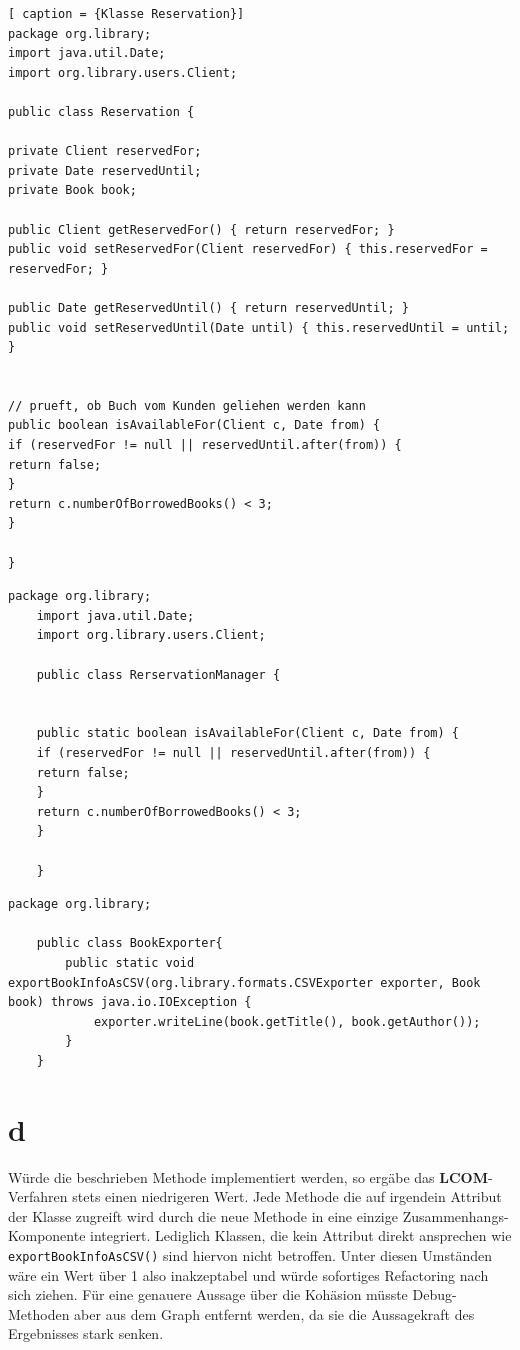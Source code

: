 \begin{lstlisting}[	caption = {Klasse Reservation}]
package org.library;
import java.util.Date;
import org.library.users.Client;

public class Reservation {

private Client reservedFor;
private Date reservedUntil;    
private Book book;

public Client getReservedFor() { return reservedFor; }
public void setReservedFor(Client reservedFor) { this.reservedFor = reservedFor; }

public Date getReservedUntil() { return reservedUntil; }
public void setReservedUntil(Date until) { this.reservedUntil = until; }


// prueft, ob Buch vom Kunden geliehen werden kann
public boolean isAvailableFor(Client c, Date from) {
if (reservedFor != null || reservedUntil.after(from)) {
return false;
}
return c.numberOfBorrowedBooks() < 3;
}

}
\end{lstlisting}

\begin{lstlisting}[caption = {RerservationManager}]
	package org.library;
	import java.util.Date;
	import org.library.users.Client;
	
	public class RerservationManager {
	

	public static boolean isAvailableFor(Client c, Date from) {
	if (reservedFor != null || reservedUntil.after(from)) {
	return false;
	}
	return c.numberOfBorrowedBooks() < 3;
	}
	
	}
\end{lstlisting}

\begin{lstlisting}[caption = BookExporter]
	package org.library;

	public class BookExporter{
		public static void exportBookInfoAsCSV(org.library.formats.CSVExporter exporter, Book book) throws java.io.IOException {        
			exporter.writeLine(book.getTitle(), book.getAuthor());        
		}   	
	}

\end{lstlisting}
\section*{d} 
Würde die beschrieben Methode implementiert werden, so ergäbe das \textbf{LCOM}-Verfahren stets einen niedrigeren Wert. Jede Methode die auf irgendein Attribut der Klasse zugreift wird durch die neue Methode in eine einzige Zusammenhangs-Komponente integriert.
Lediglich Klassen, die kein Attribut direkt ansprechen wie \texttt{exportBookInfoAsCSV()} sind hiervon nicht betroffen.
Unter diesen Umständen wäre ein Wert über 1 also inakzeptabel und würde sofortiges Refactoring nach sich ziehen. Für eine genauere Aussage über die Kohäsion müsste Debug-Methoden aber aus dem Graph entfernt werden, da sie die Aussagekraft des Ergebnisses stark senken. 


